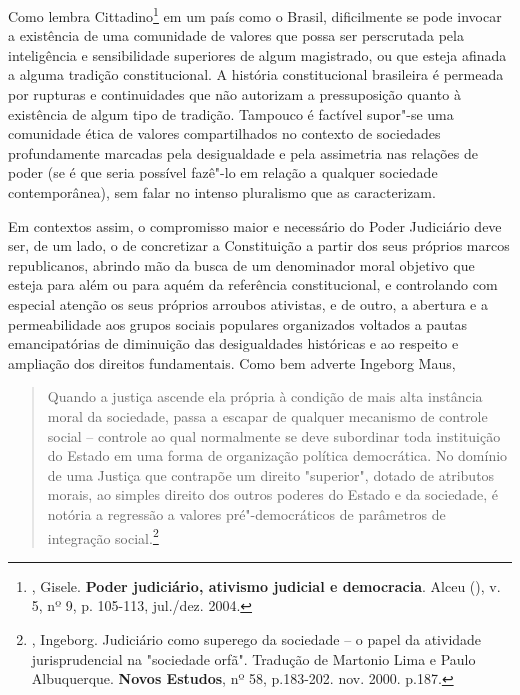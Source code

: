 Como lembra Cittadino\footnote{, Gisele. \textbf{Poder
  judiciário, ativismo judicial e democracia}. Alceu (), v. 5, nº
  9, p. 105-113, jul./dez. 2004.} em um país como o Brasil, dificilmente
se pode invocar a existência de uma comunidade de valores que possa ser
perscrutada pela inteligência e sensibilidade superiores de algum
magistrado, ou que esteja afinada a alguma tradição constitucional. A
história constitucional brasileira é permeada por rupturas e
continuidades que não autorizam a pressuposição quanto à existência de
algum tipo de tradição. Tampouco é factível supor"-se uma comunidade
ética de valores compartilhados no contexto de sociedades profundamente
marcadas pela desigualdade e pela assimetria nas relações de poder (se é
que seria possível fazê"-lo em relação a qualquer sociedade
contemporânea), sem falar no intenso pluralismo que as caracterizam.

Em contextos assim, o compromisso maior e necessário do Poder Judiciário
deve ser, de um lado, o de concretizar a Constituição a partir dos seus
próprios marcos republicanos, abrindo mão da busca de um denominador
moral objetivo que esteja para além ou para aquém da referência
constitucional, e controlando com especial atenção os seus próprios
arroubos ativistas, e de outro, a abertura e a permeabilidade aos grupos
sociais populares organizados voltados a pautas emancipatórias de
diminuição das desigualdades históricas e ao respeito e ampliação dos
direitos fundamentais. Como bem adverte Ingeborg Maus,

\begin{quote}
Quando a justiça ascende ela própria à condição de mais alta instância
moral da sociedade, passa a escapar de qualquer mecanismo de controle
social -- controle ao qual normalmente se deve subordinar toda
instituição do Estado em uma forma de organização política democrática.
No domínio de uma Justiça que contrapõe um direito "superior", dotado de
atributos morais, ao simples direito dos outros poderes do Estado e da
sociedade, é notória a regressão a valores pré"-democráticos de
parâmetros de integração social.\footnote{, Ingeborg. Judiciário
  como superego da sociedade -- o papel da atividade jurisprudencial na
  "sociedade orfã". Tradução de Martonio Lima e Paulo Albuquerque.
  \textbf{Novos Estudos}, nº 58, p.183-202. nov. 2000. p.187.}
\end{quote}

